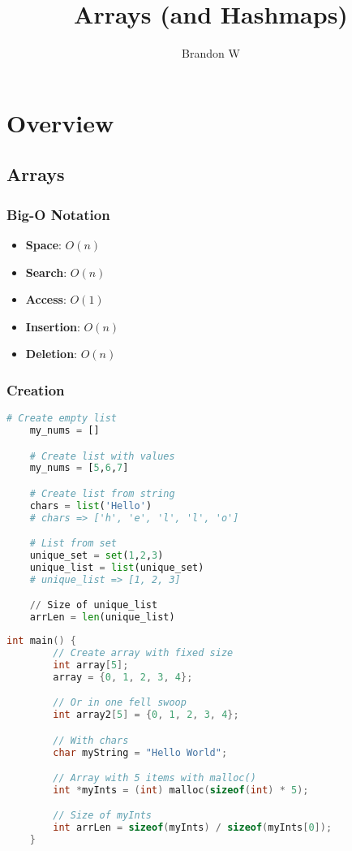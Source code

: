 \documentclass[12pt, letterpaper]{report}
\title{\textbf{\textcolor{ctpPink}{Arrays (and Hashmaps)}}}
\author{Brandon W}
\date{}
\begin{document}
\maketitle

\tableofcontents

\chapter{Overview}

\section{Arrays}
\subsection{Big-O Notation}
\begin{itemize}
    \item \textbf{Space}: \(O(n)\)
    \item \textbf{Search}: \(O(n)\)
    \item \textbf{Access}: \(O(1)\)
    \item \textbf{Insertion}: \(O(n)\)
    \item \textbf{Deletion}: \(O(n)\)
\end{itemize}

\subsection{Creation}

\begin{lstlisting}[language=Python,style=python,caption={Arrays in Python}]
    # Create empty list
    my_nums = []

    # Create list with values
    my_nums = [5,6,7]

    # Create list from string
    chars = list('Hello')
    # chars => ['h', 'e', 'l', 'l', 'o']

    # List from set
    unique_set = set(1,2,3)
    unique_list = list(unique_set)
    # unique_list => [1, 2, 3]

    // Size of unique_list
    arrLen = len(unique_list)
\end{lstlisting}

\pagebreak

\begin{lstlisting}[language=C,style=c,caption={Arrays in C}]
    int main() {
        // Create array with fixed size
        int array[5];
        array = {0, 1, 2, 3, 4};

        // Or in one fell swoop
        int array2[5] = {0, 1, 2, 3, 4};

        // With chars
        char myString = "Hello World";

        // Array with 5 items with malloc()
        int *myInts = (int) malloc(sizeof(int) * 5);

        // Size of myInts
        int arrLen = sizeof(myInts) / sizeof(myInts[0]);
    }
    
\end{lstlisting}
\end{document}
